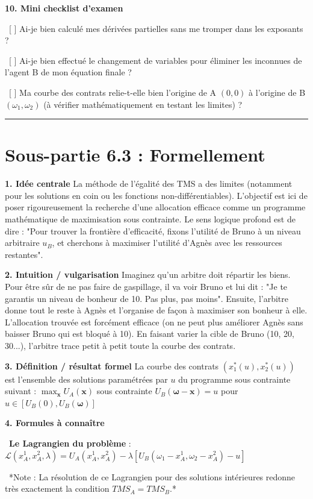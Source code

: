 \documentclass[11pt, a4paper]{report}
\begin{document}
\textbf{10. Mini checklist d'examen}
\par \textbullet\ [ ] Ai-je bien calculé mes dérivées partielles sans me tromper dans les exposants ?
\par \textbullet\ [ ] Ai-je bien effectué le changement de variables pour éliminer les inconnues de l'agent B de mon équation finale ?
\par \textbullet\ [ ] Ma courbe des contrats relie-t-elle bien l'origine de A $(0,0)$ à l'origine de B $(\omega_1, \omega_2)$ (à vérifier mathématiquement en testant les limites) ?

\vspace{1cm}\hrule\vspace{1cm}

\section{Sous-partie 6.3 : Formellement}

\textbf{1. Idée centrale}
La méthode de l'égalité des TMS a des limites (notamment pour les solutions en coin ou les fonctions non-différentiables). L'objectif est ici de poser rigoureusement la recherche d'une allocation efficace comme un programme mathématique de maximisation sous contrainte. Le sens logique profond est de dire : "Pour trouver la frontière d'efficacité, fixons l'utilité de Bruno à un niveau arbitraire $u_B$, et cherchons à maximiser l'utilité d'Agnès avec les ressources restantes".

\textbf{2. Intuition / vulgarisation}
Imaginez qu'un arbitre doit répartir les biens. Pour être sûr de ne pas faire de gaspillage, il va voir Bruno et lui dit : "Je te garantis un niveau de bonheur de 10. Pas plus, pas moins". Ensuite, l'arbitre donne tout le reste à Agnès et l'organise de façon à maximiser son bonheur à elle. L'allocation trouvée est forcément efficace (on ne peut plus améliorer Agnès sans baisser Bruno qui est bloqué à 10). En faisant varier la cible de Bruno (10, 20, 30...), l'arbitre trace petit à petit toute la courbe des contrats.

\textbf{3. Définition / résultat formel}
La courbe des contrats $(x_1^*(u), x_2^*(u))$ est l'ensemble des solutions paramétrées par $u$ du programme sous contrainte suivant :
$\max_{\mathbf{x}} U_A(\mathbf{x})$
sous contrainte $U_B(\mathbf{\omega} - \mathbf{x}) = u$
pour $u \in [U_B(0), U_B(\mathbf{\omega})]$

\textbf{4. Formules à connaître}
\par \textbullet\ \textbf{Le Lagrangien du problème} : $\mathcal{L}(x_A^1, x_A^2, \lambda) = U_A(x_A^1, x_A^2) - \lambda [U_B(\omega_1 - x_A^1, \omega_2 - x_A^2) - u]$
\par \textbullet\ *Note : La résolution de ce Lagrangien pour des solutions intérieures redonne très exactement la condition $TMS_A = TMS_B$.*
\end{document}

